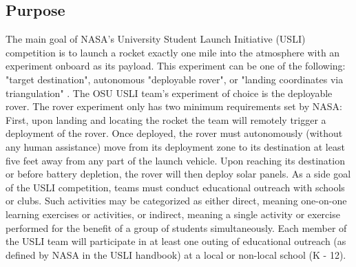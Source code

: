 \documentclass[onecolumn, draftclsnofoot,10pt, compsoc]{IEEEtran}
\begin{document}
\subsection{Purpose}
The main goal of NASA's University Student Launch Initiative (USLI) competition is to launch a rocket exactly one mile into the atmosphere with an experiment onboard as its payload. This experiment can be one of the following: "target destination", autonomous "deployable rover", or "landing coordinates via triangulation" \cite{USLI_handbook}. The OSU USLI team's experiment of choice is the deployable rover. The rover experiment only has two minimum requirements set by NASA: First, upon landing and locating the rocket the team will remotely trigger a deployment of the rover. Once deployed, the rover must autonomously (without any human assistance) move from its deployment zone to its destination at least five feet away from any part of the launch vehicle. Upon reaching its destination or before battery depletion, the rover will then deploy solar panels. As a side goal of the USLI competition, teams must conduct educational outreach with schools or clubs. Such activities may be categorized as either direct, meaning one-on-one learning exercises or activities, or indirect, meaning a single activity or exercise performed for the benefit of a group of students simultaneously. Each member of the USLI team will participate in at least one outing of educational outreach (as defined by NASA in the USLI handbook) at a local or non-local school (K - 12).
\end{document}
